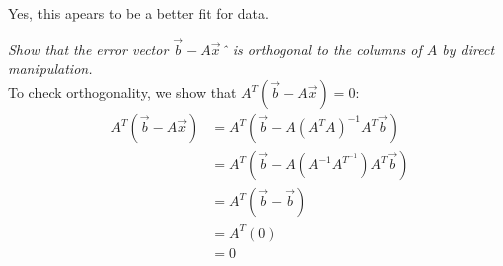 \documentclass[letter]{article}
\newenvironment{menumerate}{\edef\backupindent{\the\parindent}
  \enumerate\setlength{\parindent}{\backupindent}}
  {\endenumerate}
\begin{document}
\begin{menumerate}
\begin{menumerate}
        \begin{center}
        \end{center}
        Yes, this apears to be a better fit for data.\\
        \item \emph{Show that the error vector $\vec{b}-A\vec{x}$ˆ is orthogonal to the columns of $A$ by direct manipulation.}\\
        To check orthogonality, we show that $A^T(\vec{b}-A\vec{x})=0$:
        \begin{equation*}
            \begin{aligned}
                A^T(\vec{b}-A\vec{x})
                &= A^T(\vec{b}-A(A^TA)^{-1}A^T\vec{b})\\
                &= A^T(\vec{b}-A(A^{-1}A^{T^{-1}})A^T\vec{b})\\
                &= A^T(\vec{b}-\vec{b})\\
                &= A^T(0)\\
                &= 0
            \end{aligned}
        \end{equation*}
    \end{menumerate}


\end{menumerate}
\end{document}
